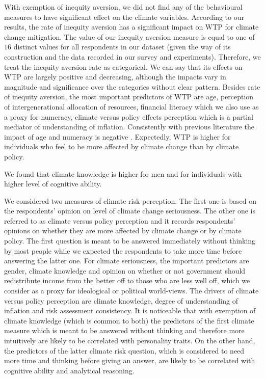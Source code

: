 \documentclass[a4paper,12pt]{article}
\begin{document}
With exemption of inequity aversion, we did not find any of the behavioural measures to have significant effect on the climate variables. According to our results, the rate of inequity aversion has a significant impact on WTP for climate change mitigation. The value of our inequity aversion measure is equal to one of $16$ distinct values for all respondents in our dataset (given the way of its construction and the data recorded in our survey and experiments). Therefore, we treat the inequity aversion rate as categorical. We can say that its effects on WTP are largely positive and decreasing, although the impacts vary in magnitude and significance over the categories without clear pattern. Besides rate of inequity aversion, the most important predictors of WTP are age, perception of intergenerational allocation of resources, financial literacy which we also use as a proxy for numeracy, climate versus policy effects perception which is a partial mediator of understanding of inflation.  Consistently with previous literature the impact of age and numeracy is negative \citep{Hamilton2011}. Expectedly, WTP is higher for individuals who feel to be more affected by climate change than by climate policy. 

We found that climate knowledge is higher for men and for individuals with higher level of cognitive ability. 

We considered two measures of climate risk perception. The first one is based on the respondents' opinion on level of climate change seriousness. The other one is referred to as climate versus policy perception and it records respondents' opinions on whether they are more affected by climate change or by climate policy. The first question is meant to be answered immediately without thinking by most people while we expected the respondents to take more time before  answering the latter one. For climate seriousness, the important predictors are gender, climate knowledge and opinion on whether or not government should redistribute income from the better off to those who are less well off, which we consider as a proxy for ideological or political world-views. The drivers of climate versus policy perception are climate knowledge, degree of understanding of inflation and risk assessment consistency. It is noticeable that with exemption of climate knowledge (which is common to both) the predictors of the first climate measure which is meant to be answered without thinking and therefore more intuitively are likely to be correlated with personality traits. On the other hand, the predictors of the latter climate risk question, which is considered to need more time and thinking before giving an answer, are likely to be correlated with cognitive ability and analytical reasoning.
\end{document}
